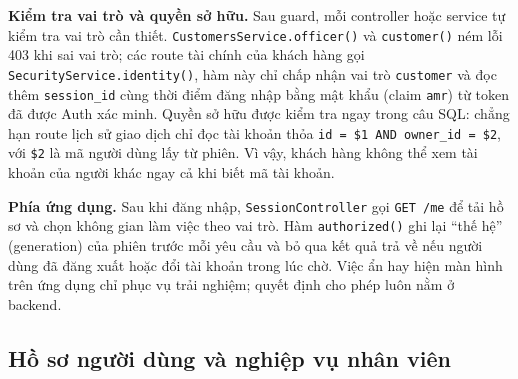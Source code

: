 \textbf{Kiểm tra vai trò và quyền sở hữu.} Sau guard, mỗi controller hoặc service tự kiểm tra vai trò cần thiết. \texttt{Customers\allowbreak{}Service.\allowbreak{}officer()} và \texttt{customer()} ném lỗi 403 khi sai vai trò; các route tài chính của khách hàng gọi \texttt{Security\allowbreak{}Service.\allowbreak{}identity()}, hàm này chỉ chấp nhận vai trò \texttt{customer} và đọc thêm \texttt{session\_\allowbreak{}id} cùng thời điểm đăng nhập bằng mật khẩu (claim \texttt{amr}) từ token đã được Auth xác minh. Quyền sở hữu được kiểm tra ngay trong câu SQL: chẳng hạn route lịch sử giao dịch chỉ đọc tài khoản thỏa \texttt{id = \$1 AND owner\_\allowbreak{}id = \$2}, với \texttt{\$2} là mã người dùng lấy từ phiên. Vì vậy, khách hàng không thể xem tài khoản của người khác ngay cả khi biết mã tài khoản.

\textbf{Phía ứng dụng.} Sau khi đăng nhập, \texttt{Session\allowbreak{}Controller} gọi \texttt{GET /\allowbreak{}me} để tải hồ sơ và chọn không gian làm việc theo vai trò. Hàm \texttt{authorized()} ghi lại ``thế hệ'' (generation) của phiên trước mỗi yêu cầu và bỏ qua kết quả trả về nếu người dùng đã đăng xuất hoặc đổi tài khoản trong lúc chờ. Việc ẩn hay hiện màn hình trên ứng dụng chỉ phục vụ trải nghiệm; quyết định cho phép luôn nằm ở backend.

\subsection{Hồ sơ người dùng và nghiệp vụ nhân viên}
\label{sec:ch3-profiles}

